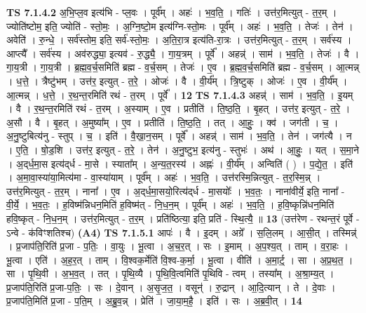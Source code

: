 \documentclass[17pt]{extarticle}
\begin{document}
                                \textbf{ TS 7.1.4.2} \newline
                  अ॒भि॒प्ल॒व इत्य॑भि - प्ल॒वः । पूर्व᳚म् । अहः॑ । भ॒व॒ति॒ । गतिः॑ । उत्त॑र॒मित्युत् - त॒र॒म् । ज्योति॑ष्टोम॒ इति॒ ज्योति॑ - स्तो॒मः॒ । अ॒ग्नि॒ष्टो॒म इत्य॑ग्नि-स्तो॒मः । पूर्व᳚म् । अहः॑ । भ॒व॒ति॒ । तेजः॑ । तेन॑ । अवेति॑ । रु॒न्धे॒ । सर्व॑स्तोम॒ इति॒ सर्व॑-स्तो॒मः॒ । अ॒ति॒रा॒त्र इत्य॑ति-रा॒त्रः । उत्त॑र॒मित्युत् - त॒र॒म् । सर्व॑स्य । आप्त्यै᳚ । सर्व॑स्य । अव॑रुद्ध्या॒ इत्यव॑ - रु॒द्ध्यै॒ । गा॒य॒त्रम् । पूर्वे᳚ । अहन्न्॑ । साम॑ । भ॒व॒ति॒ । तेजः॑ । वै । गा॒य॒त्री । गा॒य॒त्री । ब्र॒ह्म॒व॒र्च॒समिति॑ ब्रह्म - व॒र्च॒सम् । तेजः॑ । ए॒व । ब्र॒ह्म॒व॒र्च॒समिति॑ ब्रह्म - व॒र्च॒सम् । आ॒त्मन्न् । ध॒त्ते॒ । त्रैष्टु॑भम् । उत्त॑र॒ इत्युत् - त॒रे॒ । ओजः॑ । वै । वी॒र्य᳚म् । त्रि॒ष्टुक् । ओजः॑ । ए॒व । वी॒र्य᳚म् । आ॒त्मन्न् । ध॒त्ते॒ । र॒थ॒न्त॒रमिति॑ रथं - त॒रम् । पूर्वे᳚ । \textbf{  12} \newline
                  \newline
                                \textbf{ TS 7.1.4.3} \newline
                  अहन्न्॑ । साम॑ । भ॒व॒ति॒ । इ॒यम् । वै । र॒थ॒न्त॒रमिति॑ रथं - त॒रम् । अ॒स्याम् । ए॒व । प्रतीति॑ । ति॒ष्ठ॒ति॒ । बृ॒हत् । उत्त॑र॒ इत्युत् - त॒रे॒ । अ॒सौ । वै । बृ॒हत् । अ॒मुष्या᳚म् । ए॒व । प्रतीति॑ । ति॒ष्ठ॒ति॒ । तत् । आ॒हुः॒ । क्व॑ । जग॑ती । च॒ । अ॒नु॒ष्टुबित्य॑नु - स्तुप् । च॒ । इति॑ । वै॒खा॒न॒सम् । पूर्वे᳚ । अहन्न्॑ । साम॑ । भ॒व॒ति॒ । तेन॑ । जग॑त्यै । न । ए॒ति॒ । षो॒ड॒शि । उत्त॑र॒ इत्युत् - त॒रे॒ । तेन॑ । अ॒नु॒ष्टुभ॒ इत्य॑नु - स्तुभः॑ । अथ॑ । आ॒हुः॒ । यत् । स॒मा॒ने । अ॒द्‌र्ध॒मा॒स इत्य॑द्‌र्ध - मा॒से । स्याता᳚म् । अ॒न्य॒त॒रस्य॑ । अह्नः॑ । वी॒र्य᳚म् । अन्विति॑ ( ) । प॒द्ये॒त॒ । इति॑ । अ॒मा॒वा॒स्या॑या॒मित्य॑मा - वा॒स्या॑याम् । पूर्व᳚म् । अहः॑ । भ॒व॒ति॒ । उत्त॑रस्मि॒न्नित्युत् - त॒र॒स्मि॒न्न् । उत्त॑र॒मित्युत् - त॒र॒म् । नाना᳚ । ए॒व । अ॒द्‌र्ध॒मा॒सयो॒रित्य॑द्‌र्ध - मा॒सयोः᳚ । भ॒व॒तः॒ । नाना॑वीर्ये॒ इति॒ नाना᳚ - वी॒र्ये॒ । भ॒व॒तः॒ । ह॒विष्म॑न्निधन॒मिति॑ ह॒विष्म॑त् - नि॒ध॒न॒म् । पूर्व᳚म् । अहः॑ । भ॒व॒ति॒ । ह॒वि॒ष्कृन्नि॑धन॒मिति॑ हवि॒ष्कृत् - नि॒ध॒न॒म् । उत्त॑र॒मित्युत् - त॒र॒म् । प्रति॑ष्ठित्या॒ इति॒ प्रति॑ - स्थि॒त्यै॒ ॥ \textbf{  13} \newline
                  \newline
                      (उत्त॑रेण - रथन्त॒रं पूर्वे - ऽन्वे - क॑विꣳशतिश्च)  \textbf{(A4)} \newline \newline
                                \textbf{ TS 7.1.5.1} \newline
                  आपः॑ । वै । इ॒दम् । अग्रे᳚ । स॒लि॒लम् । आ॒सी॒त् । तस्मिन्न्॑ । प्र॒जाप॑ति॒रिति॑ प्र॒जा - प॒तिः॒ । वा॒युः । भू॒त्वा । अ॒च॒र॒त् । सः । इ॒माम् । अ॒प॒श्य॒त् । ताम् । व॒रा॒हः । भू॒त्वा । एति॑ । अ॒ह॒र॒त् । ताम् । वि॒श्वक॒र्मेति॑ वि॒श्व-क॒र्मा॒ । भू॒त्वा । वीति॑ । अ॒मा॒र्ट्॒ । सा । अ॒प्र॒थ॒त॒ । सा । पृ॒थि॒वी । अ॒भ॒व॒त् । तत् । पृ॒थि॒व्यै । पृ॒थि॒वि॒त्वमिति॑ पृ॒थिवि - त्वम् । तस्या᳚म् । अ॒श्रा॒म्य॒त् । प्र॒जाप॑ति॒रिति॑ प्र॒जा-प॒तिः॒ । सः । दे॒वान् । अ॒सृ॒ज॒त॒ । वसून्॑ । रु॒द्रान् । आ॒दि॒त्यान् । ते । दे॒वाः । प्र॒जाप॑ति॒मिति॑ प्र॒जा - प॒ति॒म् । अ॒ब्रु॒व॒न्न् । प्रेति॑ । जा॒या॒म॒है॒ । इति॑ । सः । अ॒ब्र॒वी॒त् । \textbf{  14} \newline
\end{document}
